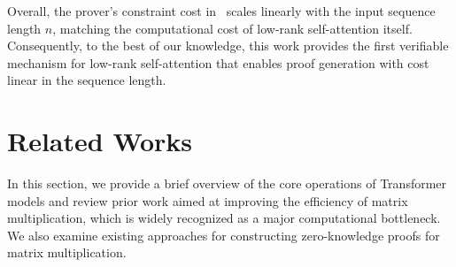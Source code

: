 \documentclass[letterpaper,twocolumn,10pt]{article}
\begin{document}
Overall, the prover’s constraint cost in \name\ scales linearly with the input sequence length $n$, matching the computational cost of low-rank self-attention itself. Consequently, to the best of our knowledge, this work provides the first verifiable mechanism for low-rank self-attention that enables proof generation with cost linear in the sequence length.




\section{Related Works}
In this section, we provide a brief overview of the core operations of Transformer models and review prior work aimed at improving the efficiency of matrix multiplication, which is widely recognized as a major computational bottleneck. We also examine existing approaches for constructing zero-knowledge proofs for matrix multiplication.
\end{document}
